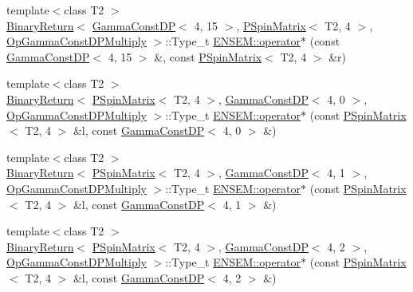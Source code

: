 \begin{DoxyCompactItemize}
\item 
{\footnotesize template$<$class T2 $>$ }\\\mbox{\hyperlink{structENSEM_1_1BinaryReturn}{Binary\+Return}}$<$ \mbox{\hyperlink{classENSEM_1_1GammaConstDP}{Gamma\+Const\+DP}}$<$ 4, 15 $>$, \mbox{\hyperlink{classENSEM_1_1PSpinMatrix}{P\+Spin\+Matrix}}$<$ T2, 4 $>$, \mbox{\hyperlink{structENSEM_1_1OpGammaConstDPMultiply}{Op\+Gamma\+Const\+D\+P\+Multiply}} $>$\+::Type\+\_\+t \mbox{\hyperlink{group__primspinmatrix_gafeff9dceaf056bcf56866006862373d8}{E\+N\+S\+E\+M\+::operator$\ast$}} (const \mbox{\hyperlink{classENSEM_1_1GammaConstDP}{Gamma\+Const\+DP}}$<$ 4, 15 $>$ \&, const \mbox{\hyperlink{classENSEM_1_1PSpinMatrix}{P\+Spin\+Matrix}}$<$ T2, 4 $>$ \&r)
\item 
{\footnotesize template$<$class T2 $>$ }\\\mbox{\hyperlink{structENSEM_1_1BinaryReturn}{Binary\+Return}}$<$ \mbox{\hyperlink{classENSEM_1_1PSpinMatrix}{P\+Spin\+Matrix}}$<$ T2, 4 $>$, \mbox{\hyperlink{classENSEM_1_1GammaConstDP}{Gamma\+Const\+DP}}$<$ 4, 0 $>$, \mbox{\hyperlink{structENSEM_1_1OpGammaConstDPMultiply}{Op\+Gamma\+Const\+D\+P\+Multiply}} $>$\+::Type\+\_\+t \mbox{\hyperlink{group__primspinmatrix_ga922c6c72866d31038a56946930310c35}{E\+N\+S\+E\+M\+::operator$\ast$}} (const \mbox{\hyperlink{classENSEM_1_1PSpinMatrix}{P\+Spin\+Matrix}}$<$ T2, 4 $>$ \&l, const \mbox{\hyperlink{classENSEM_1_1GammaConstDP}{Gamma\+Const\+DP}}$<$ 4, 0 $>$ \&)
\item 
{\footnotesize template$<$class T2 $>$ }\\\mbox{\hyperlink{structENSEM_1_1BinaryReturn}{Binary\+Return}}$<$ \mbox{\hyperlink{classENSEM_1_1PSpinMatrix}{P\+Spin\+Matrix}}$<$ T2, 4 $>$, \mbox{\hyperlink{classENSEM_1_1GammaConstDP}{Gamma\+Const\+DP}}$<$ 4, 1 $>$, \mbox{\hyperlink{structENSEM_1_1OpGammaConstDPMultiply}{Op\+Gamma\+Const\+D\+P\+Multiply}} $>$\+::Type\+\_\+t \mbox{\hyperlink{group__primspinmatrix_gae75fd887b0fbf22c05f8739b68d7428c}{E\+N\+S\+E\+M\+::operator$\ast$}} (const \mbox{\hyperlink{classENSEM_1_1PSpinMatrix}{P\+Spin\+Matrix}}$<$ T2, 4 $>$ \&l, const \mbox{\hyperlink{classENSEM_1_1GammaConstDP}{Gamma\+Const\+DP}}$<$ 4, 1 $>$ \&)
\item 
{\footnotesize template$<$class T2 $>$ }\\\mbox{\hyperlink{structENSEM_1_1BinaryReturn}{Binary\+Return}}$<$ \mbox{\hyperlink{classENSEM_1_1PSpinMatrix}{P\+Spin\+Matrix}}$<$ T2, 4 $>$, \mbox{\hyperlink{classENSEM_1_1GammaConstDP}{Gamma\+Const\+DP}}$<$ 4, 2 $>$, \mbox{\hyperlink{structENSEM_1_1OpGammaConstDPMultiply}{Op\+Gamma\+Const\+D\+P\+Multiply}} $>$\+::Type\+\_\+t \mbox{\hyperlink{group__primspinmatrix_ga6c042cd1d538338f171e9e0b588b7b8e}{E\+N\+S\+E\+M\+::operator$\ast$}} (const \mbox{\hyperlink{classENSEM_1_1PSpinMatrix}{P\+Spin\+Matrix}}$<$ T2, 4 $>$ \&l, const \mbox{\hyperlink{classENSEM_1_1GammaConstDP}{Gamma\+Const\+DP}}$<$ 4, 2 $>$ \&)

\end{DoxyCompactItemize}

